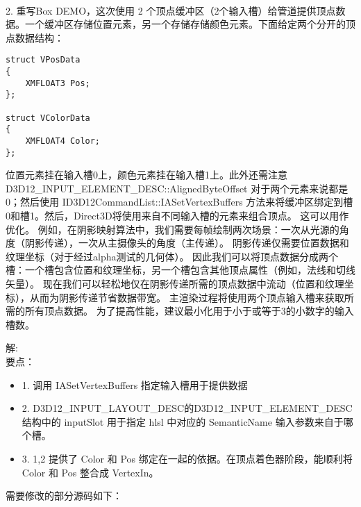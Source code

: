 \begin{flushleft}
~\\
2. 重写Box DEMO，这次使用 2 个顶点缓冲区（2个输入槽）给管道提供顶点数据。一个缓冲区存储位置元素，另一个存储存储颜色元素。下面给定两个分开的顶点数据结构：\\
\end{flushleft}
\begin{lstlisting}
struct VPosData
{
    XMFLOAT3 Pos;
};

struct VColorData
{
    XMFLOAT4 Color;
};
\end{lstlisting}
\begin{flushleft}
位置元素挂在输入槽0上，颜色元素挂在输入槽1上。此外还需注意 D3D12\_INPUT\_ELEMENT\_DESC::AlignedByteOffset 对于两个元素来说都是0；然后使用 ID3D12CommandList::IASetVertexBuffers 方法来将缓冲区绑定到槽0和槽1。然后，Direct3D将使用来自不同输入槽的元素来组合顶点。 这可以用作优化。 例如，在阴影映射算法中，我们需要每帧绘制两次场景：一次从光源的角度（阴影传递），一次从主摄像头的角度（主传递）。 阴影传递仅需要位置数据和纹理坐标（对于经过alpha测试的几何体）。 因此我们可以将顶点数据分成两个槽：一个槽包含位置和纹理坐标，另一个槽包含其他顶点属性（例如，法线和切线矢量）。 现在我们可以轻松地仅在阴影传递所需的顶点数据中流动（位置和纹理坐标），从而为阴影传递节省数据带宽。 主渲染过程将使用两个顶点输入槽来获取所需的所有顶点数据。 为了提高性能，建议最小化用于小于或等于3的小数字的输入槽数。\\
\end{flushleft}
\begin{flushleft}
解:\\
要点：\\
\begin{itemize}
  \item 1. 调用 IASetVertexBuffers 指定输入槽用于提供数据
  \item 2. D3D12\_INPUT\_LAYOUT\_DESC的D3D12\_INPUT\_ELEMENT\_DESC 结构中的 inputSlot 用于指定 hlsl 中对应的 SemanticName 输入参数来自于哪个槽。
  \item 3. 1,2 提供了 Color 和 Pos 绑定在一起的依据。在顶点着色器阶段，能顺利将 Color 和 Pos 整合成 VertexIn。
\end{itemize}
需要修改的部分源码如下：\\
\end{flushleft}
